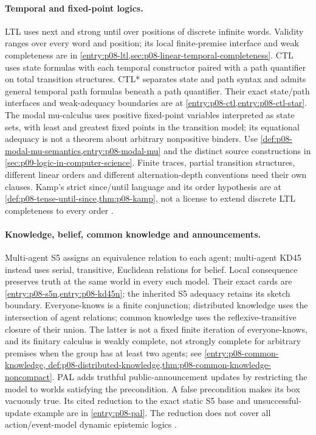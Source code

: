 \paragraph{Temporal and fixed-point logics.}
\label{entry:p14-directory-temporal}
LTL uses next and strong until over positions of discrete infinite words.
Validity ranges over every word and position; its local finite-premise
interface and weak completeness are in
\cref{entry:p08-ltl,sec:p08-linear-temporal-completeness}.
CTL uses state formulas with each temporal constructor paired with a
path quantifier on total transition structures. CTL* separates state
and path syntax and admits general temporal path formulas beneath a
path quantifier. Their exact state/path interfaces and weak-adequacy
boundaries are at \cref{entry:p08-ctl,entry:p08-ctl-star}.
The modal mu-calculus uses positive fixed-point variables interpreted
as state sets, with least and greatest fixed points in the transition
model; its equational adequacy is not a theorem about arbitrary nonpositive
binders. Use \cref{def:p08-modal-mu-semantics,entry:p08-modal-mu}
and the distinct source constructions in
\cref{sec:p09-logic-in-computer-science}.
Finite traces, partial transition structures, different linear orders
and different alternation-depth conventions need their own clauses.
Kamp's strict since/until language and its order hypothesis are at
\cref{def:p08-tense-until-since,thm:p08-kamp}, not a license to extend
discrete LTL completeness to every order
\cite{GabbayPnueliShelahStavi1980,SistlaClarke1985,EmersonHalpern1986,
Reynolds2001,Kozen1983,Walukiewicz2000,Kamp1968}.

\paragraph{Knowledge, belief, common knowledge and announcements.}
\label{entry:p14-directory-epistemic}
Multi-agent S5 assigns an equivalence relation to each agent; multi-agent
KD45 instead uses serial, transitive, Euclidean relations for belief.
Local consequence preserves truth at the same world in every such
model. Their exact cards are \cref{entry:p08-s5n,entry:p08-kd45n};
the inherited S5 adequacy retains its sketch boundary.
Everyone-knows is a finite conjunction; distributed knowledge uses the
intersection of agent relations; common knowledge uses the
reflexive-transitive closure of their union. The latter is not a fixed
finite iteration of everyone-knows, and its finitary calculus is weakly
complete, not strongly complete for arbitrary premises when the group has
at least two agents; see \cref{entry:p08-common-knowledge,
def:p08-distributed-knowledge,thm:p08-common-knowledge-noncompact}.
PAL adds truthful public-announcement updates by restricting the model
to worlds satisfying the precondition. A false precondition makes its
box vacuously true. Its cited reduction to the exact static S5 base and
unsuccessful-update example are in \cref{entry:p08-pal}.
The reduction does not cover all action/event-model dynamic epistemic
logics \cite{Hintikka1962,FaginHalpernMosesVardi1995,Plaza1989,
BaltagMossSolecki1998,VanDitmarschVanDerHoekKooi2007}.

